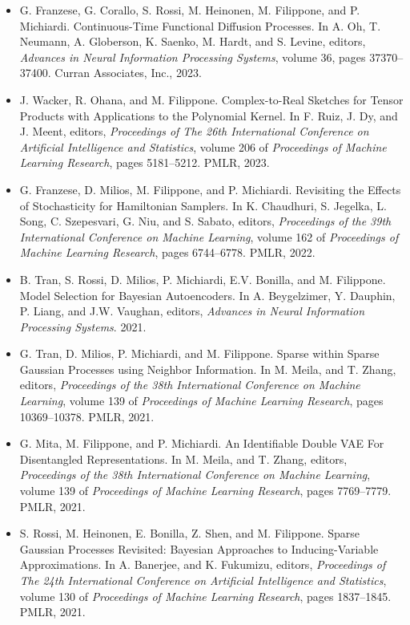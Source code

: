 \begin{itemize}
\item  G. Franzese, G. Corallo, S. Rossi, M. Heinonen, M. Filippone, and P. Michiardi. Continuous-Time Functional Diffusion Processes. In A. Oh, T. Neumann, A. Globerson, K. Saenko, M. Hardt, and S. Levine, editors, \emph{Advances in Neural Information Processing Systems}, volume 36, pages 37370--37400. Curran Associates, Inc., 2023.
\item  J. Wacker, R. Ohana, and M. Filippone. Complex-to-Real Sketches for Tensor Products with Applications to the Polynomial Kernel. In F. Ruiz, J. Dy, and J. Meent, editors, \emph{Proceedings of The 26th International Conference on Artificial Intelligence and Statistics}, volume 206 of \emph{Proceedings of Machine Learning Research}, pages 5181--5212. PMLR, 2023.
\item  G. Franzese, D. Milios, M. Filippone, and P. Michiardi. Revisiting the Effects of Stochasticity for {H}amiltonian Samplers. In K. Chaudhuri, S. Jegelka, L. Song, C. Szepesvari, G. Niu, and S. Sabato, editors, \emph{Proceedings of the 39th International Conference on Machine Learning}, volume 162 of \emph{Proceedings of Machine Learning Research}, pages 6744--6778. PMLR, 2022.
\item  B. Tran, S. Rossi, D. Milios, P. Michiardi, E.V. Bonilla, and M. Filippone. Model Selection for {B}ayesian Autoencoders. In A. Beygelzimer, Y. Dauphin, P. Liang, and J.W. Vaughan, editors, \emph{Advances in Neural Information Processing Systems}. 2021.
\item  G. Tran, D. Milios, P. Michiardi, and M. Filippone. {Sparse within Sparse Gaussian Processes using Neighbor Information}. In M. Meila, and T. Zhang, editors, \emph{Proceedings of the 38th International Conference on Machine Learning}, volume 139 of \emph{Proceedings of Machine Learning Research}, pages 10369--10378. PMLR, 2021.
\item  G. Mita, M. Filippone, and P. Michiardi. {An Identifiable Double VAE For Disentangled Representations}. In M. Meila, and T. Zhang, editors, \emph{Proceedings of the 38th International Conference on Machine Learning}, volume 139 of \emph{Proceedings of Machine Learning Research}, pages 7769--7779. PMLR, 2021.
\item  S. Rossi, M. Heinonen, E. Bonilla, Z. Shen, and M. Filippone. {Sparse Gaussian Processes Revisited: Bayesian Approaches to Inducing-Variable Approximations}. In A. Banerjee, and K. Fukumizu, editors, \emph{Proceedings of The 24th International Conference on Artificial Intelligence and Statistics}, volume 130 of \emph{Proceedings of Machine Learning Research}, pages 1837--1845. PMLR, 2021.

\end{itemize}
